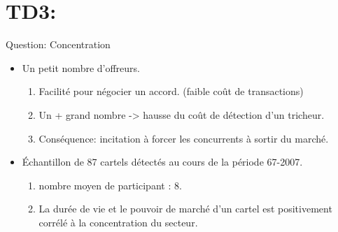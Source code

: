 \section{TD3: \cite{CombeMonierREF2012} }
\frame{\sectionpage}

\begin{frame}[allowframebreaks]{Question: Concentration}
    \begin{itemize}
        \item Un petit nombre d’offreurs.
        \begin{enumerate}[-]
\item Facilité pour négocier un accord. (faible coût de
transactions)
\item Un + grand nombre -> hausse du coût de détection d’un
tricheur.
\item Conséquence: incitation à forcer les concurrents à sortir du marché.
        \end{enumerate}
        \item Échantillon de 87 cartels détectés au cours de la période 67-2007.
        \begin{enumerate}[-]
        \item nombre moyen de participant : 8.
        \item La durée de vie et le pouvoir de marché d’un cartel est
        positivement corrélé à la concentration du secteur.
    \end{enumerate}
    \end{itemize}
\end{frame}

